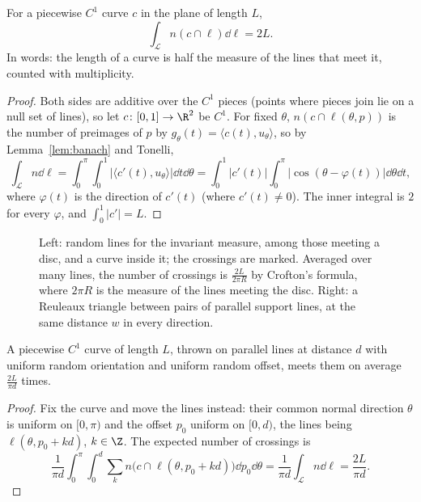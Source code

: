 \begin{theorem}[Crofton, 1868]\label{thm:crofton}
For a piecewise $C^1$ curve $c$ in the plane of length $L$,
\[\int_{\mathcal L}n(c\cap\ell)\dd\ell=2L.\]
In words: the length of a curve is half the measure of the lines that meet it, counted with multiplicity.
\end{theorem}

\begin{proof}
Both sides are additive over the $C^1$ pieces (points where pieces join lie on a null set of lines), so let $c\colon[0,1]\to\R^2$ be $C^1$. For fixed $\theta$, $n(c\cap\ell(\theta,p))$ is the number of preimages of $p$ by
$g_\theta(t)=\langle c(t),u_\theta\rangle$, so by Lemma~\ref{lem:banach} and Tonelli,
\[\int_{\mathcal L}n\dd\ell=\int_0^\pi\!\!\int_0^1|\langle c'(t),u_\theta\rangle|\dd t\dd\theta=\int_0^1|c'(t)|\int_0^\pi|\cos(\theta-\varphi(t))|\dd\theta\dd t,\]
where $\varphi(t)$ is the direction of $c'(t)$ (where $c'(t)\neq0$). The inner integral is $2$ for every $\varphi$, and $\int_0^1|c'|=L$.
\end{proof}

\begin{figure}[ht]
\centering
{}
\caption{Left: random lines for the invariant measure, among those meeting a disc, and a curve inside it; the crossings are marked. Averaged over many lines, the number of crossings is
$\frac{2L}{2\pi R}$ by Crofton's formula, where $2\pi R$ is the measure of the lines meeting the disc. Right: a Reuleaux triangle between pairs of parallel support lines, at the same distance $w$ in every direction.}
\label{fig:crofton}
\end{figure}

\begin{corollary}\label{cor:noodle}
A piecewise $C^1$ curve of length $L$, thrown on parallel lines at distance $d$ with uniform random orientation and uniform random offset, meets them on average $\frac{2L}{\pi d}$ times.
\end{corollary}

\begin{proof}
Fix the curve and move the lines instead: their common normal direction $\theta$ is uniform on $[0,\pi)$ and the offset $p_0$ uniform on $[0,d)$, the lines being $\ell(\theta,p_0+kd)$, $k\in\Z$. The expected number of crossings is
\[\frac1{\pi d}\int_0^\pi\!\!\int_0^d\sum_kn\bigl(c\cap\ell(\theta,p_0+kd)\bigr)\dd p_0\dd\theta=\frac1{\pi d}\int_{\mathcal L}n\dd\ell=\frac{2L}{\pi d}.\]
\end{proof}

